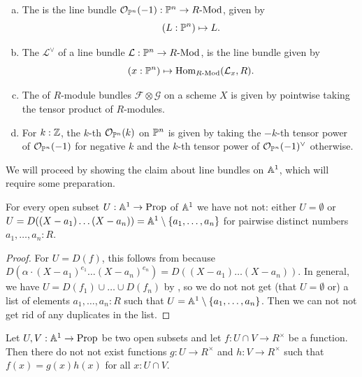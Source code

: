 \begin{definition}
  \begin{enumerate}[(a)]
  \item The  is the line bundle $\mathcal O_{\mathbb{P}^n}(-1):\mathbb{P}^n\to R\text{-}\mathrm{Mod}$,
    given by
    \[ (L:\bP^n)\mapsto L\rlap{.}\]
  \item The  $\mathcal L^\vee$ of a line bundle $\mathcal L:\mathbb{P}^n\to R\text{-}\mathrm{Mod}$,
    is the line bundle given by
    \[ (x:\bP^n)\mapsto \Hom_{\Mod{R}}(\mathcal L_x,R)\rlap{.}\]
  \item The  of $R$-module bundles $\mathcal F\otimes \mathcal G$
    on a scheme $X$
    is given by pointwise taking the tensor product of $R$-modules.
  \item For $k:\mathbb{Z}$, the $k$-th  $\mathcal{O}_{\mathbb{P}^n}(k)$ on $\mathbb{P}^n$
    is given by taking the $-k$-th tensor power of $\mathcal O_{\mathbb{P}^n}(-1)$ for negative $k$
    and the $k$-th tensor power of $\mathcal O_{\mathbb{P}^n}(-1)^{\vee}$ otherwise.
  \end{enumerate}
\end{definition}


We will proceed by showing the claim about line bundles on $\mathbb{A}^1$,
which will require some preparation.

\begin{lemma}
  For every open subset $U : \mathbb{A}^1 \to \mathrm{Prop}$ of $\mathbb{A}^1$
  we have not not:
  either $U = \emptyset$
  or $U = D((X - a_1)\dots(X - a_n)) = \mathbb{A}^1 \setminus \{ a_1, \dots, a_n \}$
  for pairwise distinct numbers $a_1, \dots, a_n : R$.
\end{lemma}

\begin{proof}
  For $U = D(f)$,
  this follows from 
  because $D(\alpha \cdot {(X - a_1)}^{e_1} \dots {(X - a_n)}^{e_n})
  = D((X - a_1) \dots (X - a_n))$.
  In general,
  we have $U = D(f_1) \cup \dots \cup D(f_n)$
  by ,
  so we do not not get
  (that $U = \emptyset$ or)
  a list of elements $a_1, \dots, a_n : R$
  such that $U = \mathbb{A}^1 \setminus \{ a_1, \dots, a_n \}$.
  Then we can not not get rid of any duplicates in the list.
\end{proof}

\begin{lemma}%
  \label{decompose-invertible-function-on-intersection-in-A1}
  Let $U, V : \mathbb{A}^1 \to \mathrm{Prop}$ be two open subsets
  and let $f : U \cap V \to R^\times$ be a function.
  Then there do not not exist functions
  $g : U \to R^\times$ and
  $h : V \to R^\times$
  such that $f(x) = g(x)h(x)$ for all $x : U \cap V$.
\end{lemma}

